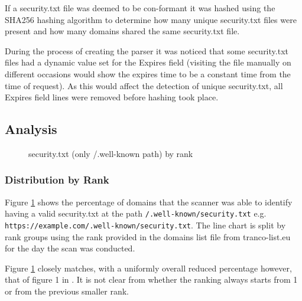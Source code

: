 \documentclass{mscreport}
\begin{document}
\vspace{0.3cm} \noindent
If a security.txt file was deemed to be con-formant it was hashed using the SHA256 hashing algorithm to determine how many unique security.txt files were present and how many domains shared the same security.txt file.

\vspace{0.3cm} \noindent
During the process of creating the parser it was noticed that some security.txt files had a dynamic value set for the Expires field (visiting the file manually on different occasions would show the expires time to be a constant time from the time of request). As this would affect the detection of unique security.txt, all Expires field lines were removed before hashing took place.

\newpage

\subsection{Analysis}

\begin{figure}[t]
	\begin{center}
		\caption{security.txt (only /.well-known path) by rank}
		\label{fig:security_txt_by_rank}
	\end{center}
\end{figure}

\subsubsection{Distribution by Rank}

\noindent
Figure \ref{fig:security_txt_by_rank} shows the percentage of domains that the scanner was able to identify having a valid security.txt at the path \texttt{/.well-known/security.txt} e.g. \newline \texttt{https://example.com/.well-known/security.txt}. The line chart is split by rank groups using the rank provided in the domains list file from tranco-list.eu for the day the scan was conducted.

\vspace{0.3cm} \noindent
Figure \ref{fig:security_txt_by_rank} closely matches, with a uniformly overall reduced percentage however, that of figure 1 in \cite{Poteat2021-zr}. It is not clear from \cite{Poteat2021-zr} whether the ranking always starts from 1 or from the previous smaller rank.
\end{document}

